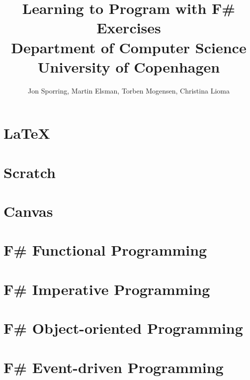 \documentclass[a4paper,12pt]{report}
\title{Learning to Program with F\#\\Exercises\\Department of Computer
  Science\\University of Copenhagen}
\author{Jon Sporring, Martin Elsman, Torben Mogensen, Christina Lioma}
\begin{document}
\maketitle
\tableofcontents
\newpage
\chapter{\LaTeX}


\chapter{Scratch}



\chapter{Canvas}



\chapter{F\# Functional Programming}


























\chapter{F\# Imperative Programming}







\chapter{F\# Object-oriented Programming}












\chapter{F\# Event-driven Programming}




\end{document}
